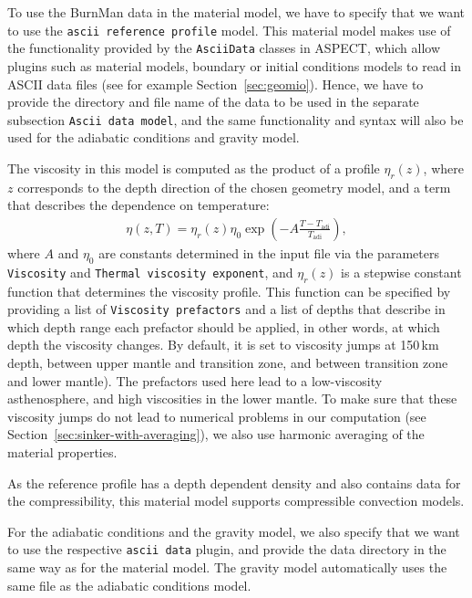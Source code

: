 \documentclass{article}
\newcommand{\aspect}{\textsc{ASPECT}}
\begin{document}
To use the BurnMan data in the material model, we have to specify that we want to use the 
\texttt{ascii reference profile} model. This material model makes use of the functionality provided by
the \texttt{AsciiData} classes in \aspect{}, which allow plugins such as material models, 
boundary or initial conditions models to read in ASCII data files (see for example Section~\ref{sec:geomio}). 
Hence, we have to provide the directory and file name of the data to be used in the separate subsection 
\texttt{Ascii data model}, and the same functionality and syntax will also be used for the 
adiabatic conditions and gravity model.

The viscosity in this model is computed as the product of a profile $\eta_r(z)$, where $z$ corresponds to the depth direction of the chosen geometry model, and a 
term that describes the dependence on temperature:
\begin{align*}
\eta(z,T) = \eta_r(z) \eta_0 \exp\left(-A \frac{T - T_{\text{adi}}}{T_{\text{adi}}}\right),
\end{align*}
where $A$ and $\eta_0$ are constants determined in the input file via the parameters 
\texttt{Viscosity} and \texttt{Thermal viscosity exponent}, and $\eta_r(z)$ is a stepwise constant 
function that determines the viscosity profile. This function can be specified by providing a list of 
\texttt{Viscosity prefactors} and a list of depths that describe in which depth range each prefactor 
should be applied, in other words, at which depth the viscosity changes. By default, it is set
to viscosity jumps at 150\,km depth, between upper mantle and transition zone, 
and between transition zone and lower mantle). The prefactors used here lead to a low-viscosity 
asthenosphere, and high viscosities in the lower mantle. To make sure that these viscosity jumps 
do not lead to numerical problems in our computation (see Section~\ref{sec:sinker-with-averaging}), 
we also use harmonic averaging of the material properties.

As the reference profile has a depth dependent density and also contains data for the compressibility, 
this material model supports compressible convection models. 

For the adiabatic conditions and the gravity model, we also specify that we want to use the respective
\texttt{ascii data} plugin, and provide the data directory in the same way as for the material 
model. The gravity model automatically uses the same file as the adiabatic conditions model.


\end{document}
